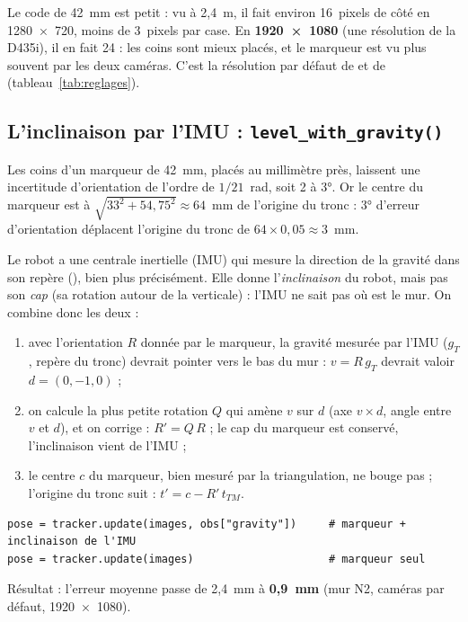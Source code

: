 \documentclass[11pt,a4paper]{article}
\newcommand{\code}[1]{\texttt{\detokenize{#1}}}
\begin{document}
Le code de 42~mm est petit : vu à 2,4~m, il fait environ 16~pixels de côté en 1280~×~720, moins de 3~pixels par
case. En \textbf{1920~×~1080} (une résolution de la D435i), il en fait 24 : les coins sont mieux placés, et le
marqueur est vu plus souvent par les deux caméras. C'est la résolution par défaut de \code{demo.py} et de
\code{live.py} (tableau~\ref{tab:reglages}).

\subsection{L'inclinaison par l'IMU : \texttt{level\_with\_gravity()}}

Les coins d'un marqueur de 42~mm, placés au millimètre près, laissent une incertitude d'orientation de l'ordre de
$1/21$~rad, soit 2 à 3°. Or le centre du marqueur est à $\sqrt{33^2 + 54{,}75^2} \approx 64$~mm de l'origine du
tronc : 3° d'erreur d'orientation déplacent l'origine du tronc de $64 \times 0{,}05 \approx 3$~mm.

Le robot a une centrale inertielle (IMU) qui mesure la direction de la gravité dans son repère
(\code{obs["gravity"]}), bien plus précisément. Elle donne l'\emph{inclinaison} du robot, mais pas son \emph{cap}
(sa rotation autour de la verticale) : l'IMU ne sait pas où est le mur. On combine donc les deux :
\begin{enumerate}
  \item avec l'orientation $R$ donnée par le marqueur, la gravité mesurée par l'IMU ($g_T$, repère du tronc) devrait
        pointer vers le bas du mur : $v = R\,g_T$ devrait valoir $d = (0, -1, 0)$ ;
  \item on calcule la plus petite rotation $Q$ qui amène $v$ sur $d$ (axe $v \times d$, angle entre $v$ et $d$), et on
        corrige : $R' = Q\,R$ ; le cap du marqueur est conservé, l'inclinaison vient de l'IMU ;
  \item le centre $c$ du marqueur, bien mesuré par la triangulation, ne bouge pas ; l'origine du tronc suit :
        $t' = c - R'\,t_{TM}$.
\end{enumerate}

\begin{lstlisting}[style=py]
pose = tracker.update(images, obs["gravity"])     # marqueur + inclinaison de l'IMU
pose = tracker.update(images)                     # marqueur seul
\end{lstlisting}

Résultat : l'erreur moyenne passe de 2,4~mm à \textbf{0,9~mm} (mur N2, caméras par défaut, 1920~×~1080).
\end{document}
